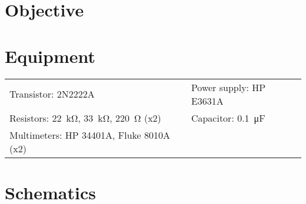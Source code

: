 

\section{Objective}

\section{Equipment}

\begin{tabular}{ll}
  \centering
  Transistor: 2N2222A               & Power supply: HP E3631A            \\
  Resistors: \SI{22}{\kilo\ohm}, \SI{33}{\kilo\ohm}, \SI{220}{\ohm} (x2) &   Capacitor: \SI{0.1}{\micro\farad} \\
 Multimeters: HP 34401A, Fluke 8010A (x2) & \\
\end{tabular}

\section{Schematics}



